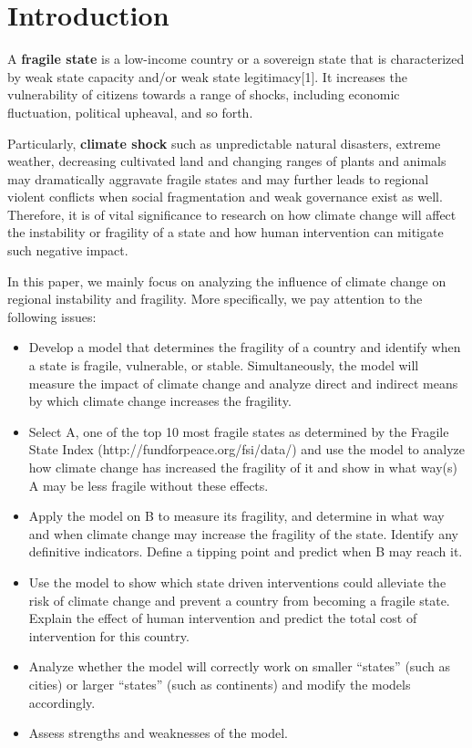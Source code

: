 \documentclass{mcmthesis}
\begin{document}
	\newpage
	\begin{center}
		\tableofcontents
		\setcounter{page}{0}
		\thispagestyle{empty}
	\end{center}
	\newpage
	
	\section{Introduction}
	
	A \textbf{fragile state} is a low-income country or a sovereign state that is characterized by weak state capacity and/or weak state legitimacy[1]. It increases the vulnerability of citizens towards a range of shocks, including economic fluctuation, political upheaval, and so forth. 
	
	Particularly, \textbf{climate shock} such as unpredictable natural disasters, extreme weather, decreasing cultivated land and changing ranges of plants and animals may dramatically aggravate fragile states and may further leads to regional violent conflicts when social fragmentation and weak governance exist as well. Therefore, it is of vital significance to research on how climate change will affect the instability or fragility of a state and how human intervention can mitigate such negative impact.
	
	In this paper, we mainly focus on analyzing the influence of climate change on regional instability and fragility. More specifically, we pay attention to the following issues:
	\begin{itemize}
		\item Develop a model that determines the fragility of a country and identify when a state is fragile, vulnerable, or stable. Simultaneously, the model will measure the impact of climate change and analyze direct and indirect means by which climate change increases the fragility.
		\item Select A, one of the top 10 most fragile states as determined by the Fragile State Index (http://fundforpeace.org/fsi/data/) and use the model to analyze how climate change has increased the fragility of it and show in what way(s) A may be less fragile without these effects.
		\item Apply the model on B to measure its fragility, and determine in what way and when climate change may increase the fragility of the state. Identify any definitive indicators. Define a tipping point and predict when B may reach it.
		\item Use the model to show which state driven interventions could alleviate the risk of climate change and prevent a country from becoming a fragile state. Explain the effect of human intervention and predict the total cost of intervention for this country.
		\item Analyze whether the model will correctly work on smaller “states” (such as cities) or larger “states” (such as continents) and modify the models accordingly.
		\item Assess strengths and weaknesses of the model.
	\end{itemize}
	
\end{document}
